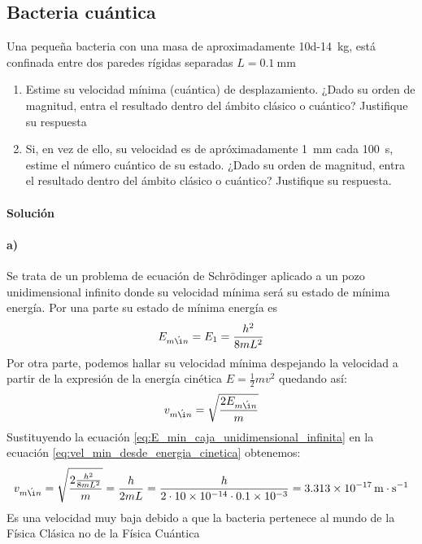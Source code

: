 \documentclass[12pt, a4paper]{article}
\begin{document}
        \subsection{Bacteria cuántica} Una pequeña bacteria con una masa de aproximadamente \SI{10d-14}{\kilo\gram},
                está confinada entre dos paredes rígidas separadas $L=\SI{0.1}{\milli\metre}$
        \begin{enumerate}[label=\alph*)]
        \item Estime su velocidad mínima (cuántica) de desplazamiento. ¿Dado su orden de magnitud,
            entra el resultado dentro del ámbito clásico o cuántico? Justifique su respuesta
        \item Si, en vez de ello, su velocidad es de apróximadamente \SI{1}{\milli\metre} cada
            \SI{100}{\second}, estime el número cuántico de su estado. ¿Dado su orden de magnitud,
            entra el resultado dentro del ámbito clásico o cuántico? Justifique su respuesta.
        \end{enumerate}


        \paragraph{\textbf{Solución}}
        \paragraph {a)} Se trata de un problema de ecuación de Schrödinger aplicado a un pozo unidimensional infinito
        donde su velocidad mínima será su estado de mínima energía. Por una parte su estado de mínima energía
        es
        \begin{equation}    \label{eq:E_min_caja_unidimensional_infinita}
            E_{m\acute{\i}n} = E_1 =\frac{h^2}{8mL^2}
        \end{equation}
        Por otra parte, podemos hallar su velocidad mínima despejando la
        velocidad a partir de la expresión de la energía cinética $E=\frac{1}{2}mv^2$ quedando así:
        \begin{equation}    \label{eq:vel_min_desde_energia_cinetica}
            v_{m\acute{\i}n}=\sqrt{\frac{2E_{m\acute{\i}n}}{m}}
        \end{equation}
        Sustituyendo la ecuación \ref{eq:E_min_caja_unidimensional_infinita} en la ecuación \ref{eq:vel_min_desde_energia_cinetica}
        obtenemos:
        $$
            v_{m\acute{\i}n}=\sqrt{\frac{2\frac{h^2}{8mL^2}}{m}} = \frac{h}{2mL} =
            \frac{h}{\num{2} \cdot \num{10d-14} \cdot \num{0.1d-3}} = \SI{3.313d-17}{\metre\cdot\second^{-1}}
        $$
        Es una velocidad muy baja debido a que la bacteria pertenece al mundo de la Física Clásica
        no de la Física Cuántica
\end{document}
